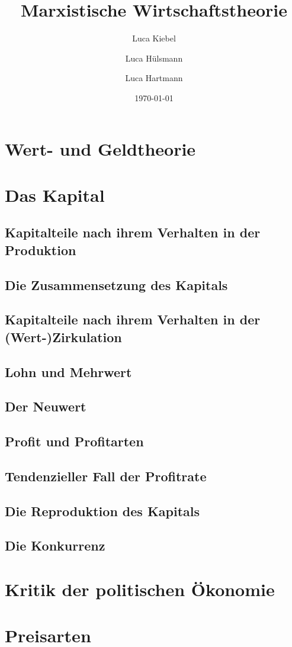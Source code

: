 \documentclass[10pt,a4paper, ngerman]{beamer}
\author{Luca Kiebel \and Luca Hülsmann \and Luca Hartmann}
\title{Marxistische Wirtschaftstheorie}
\date{\today}
\institute[HBBK]{Hans-Böckler-Berufskolleg}
\begin{document}
\begin{frame}
\titlepage
\end{frame}

\section{Wert- und Geldtheorie}

\section{Das Kapital}
\subsection{Kapitalteile nach ihrem Verhalten in der Produktion}
\subsection{Die Zusammensetzung des Kapitals}
\subsection{Kapitalteile nach ihrem Verhalten in der (Wert-)Zirkulation}
\subsection{Lohn und Mehrwert}
\subsection{Der Neuwert}
\subsection{Profit und Profitarten}
\subsection{Tendenzieller Fall der Profitrate}
\subsection{Die Reproduktion des Kapitals}
\subsection{Die Konkurrenz}


\section{Kritik der politischen Ökonomie}

\section{Preisarten}
\end{document}
